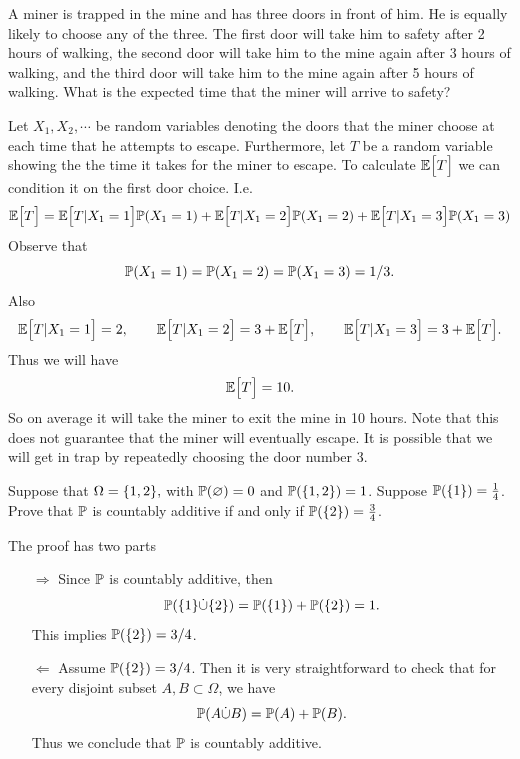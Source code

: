 \begin{problem}
	A miner is trapped in the mine and has three doors in front of him. He is equally likely to choose any of the three. The first door will take him to safety after 2 hours of walking, the second door will take him to the mine again after 3 hours of walking, and the third door will take him to the mine again after 5 hours of walking. What is the expected time that the miner will arrive to safety?
\end{problem}
\begin{solution}
	Let $ X_1,X_2,\cdots $ be random variables denoting the doors that the miner choose at each time that he attempts to escape. Furthermore, let $ T $ be a random variable showing the the time it takes for the miner to escape. To calculate $ \mathbb{E}\big[T\big] $ we can condition it on the first door choice. I.e.
	\[ \mathbb{E}\big[T\big] = \mathbb{E}\big[T|X_1 =1\big]\mathbb{P}(X_1=1) + \mathbb{E}\big[T|X_1 =2\big]\mathbb{P}(X_1=2)+\mathbb{E}\big[T|X_1 =3\big]\mathbb{P}(X_1=3) \]
	Observe that 
	\[ \mathbb{P}(X_1=1) = \mathbb{P}(X_1=2) = \mathbb{P}(X_1=3) = 1/3. \]
	Also
	\[  \mathbb{E}\big[T|X_1 =1\big] = 2,\qquad  \mathbb{E}\big[T|X_1 =2\big] = 3+\mathbb{E}\big[T\big], \qquad \mathbb{E}\big[T|X_1 =3\big] = 3+\mathbb{E}\big[T\big]. \]
	Thus we will have
	\[ \mathbb{E}\big[T\big] = 10. \]
	So on average it will take the miner to exit the mine in 10 hours. Note that this does not guarantee that the miner will eventually escape. It is possible that we will get in trap by repeatedly choosing the door number 3.
\end{solution}
 
\begin{problem}
	Suppose that $ \Omega = \{1,2\}, $ with $ \mathbb{P}(\varnothing) = 0 $ and $ \mathbb{P}(\{1,2\}) = 1 $. Suppose $ \mathbb{P}(\{1\}) = \frac14 $. Prove that $ \mathbb{P} $ is countably additive if and only if $ \mathbb{P}(\{2\})=\frac34 $.
\end{problem}
\begin{solution}
	The proof has two parts
	\begin{itemize}
		\item [$ \boxed{\Longrightarrow} $] Since $ \mathbb{P} $ is countably additive, then 
		\[ \mathbb{P}(\{1\} \dot\cup \{2\}) = \mathbb{P}(\{1\}) + \mathbb{P}(\{2\}) = 1. \]
		This implies $ \mathbb{P}(\{2\}) = 3/4 $.
		\item [$ \boxed{\Longleftarrow} $] Assume $ \mathbb{P}(\{2\}) = 3/4 $. Then it is very straightforward to check that for every disjoint subset $ A,B \subset \Omega $, we have
		\[ \mathbb{P}(A \dot\cup B) = \mathbb{P}(A) + \mathbb{P}(B). \]
		Thus we conclude that $ \mathbb{P} $ is countably additive.
	\end{itemize}
\end{solution}

